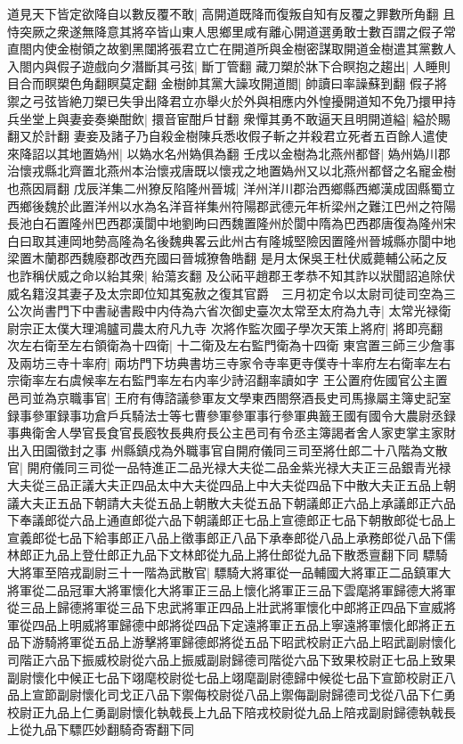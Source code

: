 道見天下皆定欲降自以數反覆不敢|{
	高開道既降而復叛自知有反覆之罪數所角翻}
且恃突厥之衆遂無降意其將卒皆山東人思鄉里咸有離心開道選勇敢士數百謂之假子常直閤内使金樹領之故劉黑闥將張君立亡在開道所與金樹密謀取開道金樹遣其黨數人入閤内與假子遊戲向夕潛斷其弓弦|{
	斷丁管翻}
藏刀槊於牀下合瞑抱之趨出|{
	人睡則目合而瞑槊色角翻瞑莫定翻}
金樹帥其黨大譟攻開道閤|{
	帥讀曰率譟蘇到翻}
假子將禦之弓弦皆絶刀槊已失爭出降君立亦舉火於外與相應内外惶擾開道知不免乃擐甲持兵坐堂上與妻妾奏樂酣飲|{
	擐音宦酣戶甘翻}
衆憚其勇不敢逼天且明開道縊|{
	縊於賜翻又於計翻}
妻妾及諸子乃自殺金樹陳兵悉收假子斬之并殺君立死者五百餘人遣使來降詔以其地置媯州|{
	以媯水名州媯俱為翻}
壬戌以金樹為北燕州都督|{
	媯州媯川郡治懷戎縣北齊置北燕州本治懷戎唐既以懷戎之地置媯州又以北燕州都督之名寵金樹也燕因肩翻}
戊辰洋集二州獠反陷隆州晉城|{
	洋州洋川郡治西鄉縣西鄉漢成固縣蜀立西鄉後魏於此置洋州以水為名洋音祥集州符陽郡武德元年析梁州之難江巴州之符陽長池白石置隆州巴西郡漢閬中地劉昫曰西魏置隆州於閬中隋為巴西郡唐復為隆州宋白曰取其連岡地勢高隆為名後魏典畧云此州古有隆城堅險因置隆州晉城縣亦閬中地梁置木蘭郡西魏廢郡改西充國曰晉城獠魯皓翻}
是月太保吳王杜伏威薨輔公祏之反也詐稱伏威之命以紿其衆|{
	紿蕩亥翻}
及公祏平趙郡王孝恭不知其詐以狀聞詔追除伏威名籍沒其妻子及太宗即位知其寃赦之復其官爵　三月初定令以太尉司徒司空為三公次尚書門下中書祕書殿中内侍為六省次御史臺次太常至太府為九寺|{
	太常光禄衛尉宗正太僕大理鴻臚司農太府凡九寺}
次將作監次國子學次天策上將府|{
	將即亮翻}
次左右衛至左右領衛為十四衛|{
	十二衛及左右監門衛為十四衛}
東宫置三師三少詹事及兩坊三寺十率府|{
	兩坊門下坊典書坊三寺家令寺率更寺僕寺十率府左右衛率左右宗衛率左右虞候率左右監門率左右内率少詩沼翻率讀如字}
王公置府佐國官公主置邑司並為京職事官|{
	王府有傳諮議參軍友文學東西閤祭酒長史司馬掾屬主簿史記室録事參軍録事功倉戶兵騎法士等七曹參軍參軍事行參軍典籖王國有國令大農尉丞録事典衛舍人學官長食官長廏牧長典府長公主邑司有令丞主簿謁者舍人家吏掌主家財出入田園徵封之事}
州縣鎮戍為外職事官自開府儀同三司至將仕郎二十八階為文散官|{
	開府儀同三司從一品特進正二品光禄大夫從二品金紫光禄大夫正三品銀青光禄大夫從三品正議大夫正四品太中大夫從四品上中大夫從四品下中散大夫正五品上朝議大夫正五品下朝請大夫從五品上朝散大夫從五品下朝議郎正六品上承議郎正六品下奉議郎從六品上通直郎從六品下朝議郎正七品上宣德郎正七品下朝散郎從七品上宣義郎從七品下給事郎正八品上徵事郎正八品下承奉郎從八品上承務郎從八品下儒林郎正九品上登仕郎正九品下文林郎從九品上將仕郎從九品下散悉亶翻下同}
驃騎大將軍至陪戎副尉三十一階為武散官|{
	驃騎大將軍從一品輔國大將軍正二品鎮軍大將軍從二品冠軍大將軍懷化大將軍正三品上懷化將軍正三品下雲麾將軍歸德大將軍從三品上歸德將軍從三品下忠武將軍正四品上壯武將軍懷化中郎將正四品下宣威將軍從四品上明威將軍歸德中郎將從四品下定遠將軍正五品上寧遠將軍懷化郎將正五品下游騎將軍從五品上游擊將軍歸德郎將從五品下昭武校尉正六品上昭武副尉懷化司階正六品下振威校尉從六品上振威副尉歸德司階從六品下致果校尉正七品上致果副尉懷化中候正七品下翊麾校尉從七品上翊麾副尉德歸中候從七品下宣節校尉正八品上宣節副尉懷化司戈正八品下禦侮校尉從八品上禦侮副尉歸德司戈從八品下仁勇校尉正九品上仁勇副尉懷化執戟長上九品下陪戎校尉從九品上陪戎副尉歸德執戟長上從九品下驃匹妙翻騎奇寄翻下同}
